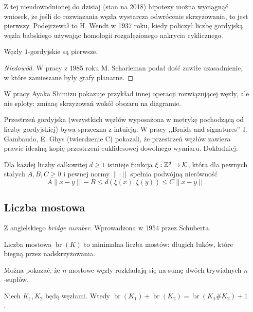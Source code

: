 Z tej nieudowodnionej do dzisiaj (stan na 2018) hipotezy można wyciągnąć wniosek,
że jeśli do rozwiązania węzła wystarcza odwrócenie skrzyżowania, to jest pierwszy.
Podejrzewał to H. Wendt w 1937 roku,
kiedy policzył liczbę gordyjską węzła babskiego używając homologii rozgałęzionego nakrycia cyklicznego.

\begin{proposition}
    Węzły $1$-gordyjskie są pierwsze.
\end{proposition}

\begin{proof}[Niedowód]
    W pracy \cite{scharleman85} z 1985 roku M. Scharleman podał dość zawiłe uzasadnienie, w które zamieszane były grafy planarne.
\end{proof}

W pracy \cite{shimizu14} Ayaka Shimizu pokazuje przykład innej operacji rozwiązującej węzły, ale nie sploty:
zmianę skrzyżowań wokół obszaru na diagramie.

Przestrzeń gordyjska
(wszystkich węzłów wyposażona w metrykę pochodzącą od liczby gordyjskiej)
bywa sprzeczna z intuicją.
W pracy ,,Braids and signatures'' J. Gambaudo, E. Ghys (twierdzenie C) pokazali,
że przestrzeń węzłów zawiera prawie idealną kopię przestrzeni euklidesowej dowolnego wymiaru.
Dokładniej:

\begin{proposition}
    Dla każdej liczby całkowitej $d \ge 1$ istnieje funkcja $\xi: \mathbb Z^d \to \mathcal{K}$, która dla pewnych stałych $A, B, C \ge 0$ i pewnej normy $\|\cdot\|$ spełnia podwójną nierówność
    \[
        A\|x-y\|  - B \le d(\xi(x), \xi(y)) \le C\|x-y\|.
    \]
\end{proposition}


\subsection{Liczba mostowa} %
\label{sub:bridge_index}
Z angielskiego \emph{bridge number}.
Wprowadzona w 1954 przez Schuberta.
\begin{definition}
    Liczba mostowa $\operatorname{br}(K)$ to minimalna liczba mostów:
    długich łuków, które biegną przez nadskrzyżowania.
\end{definition}

Można pokazać, że $n$-mostowe węzły rozkładają się na sumę dwóch trywialnych $n$-supłów.

\begin{proposition}
    Niech $K_1, K_2$ będą węzłami.
    Wtedy $\operatorname{br} (K_1) + \operatorname{br}(K_2) = \operatorname{br}(K_1 \# K_2) + 1$.
\end{proposition}

